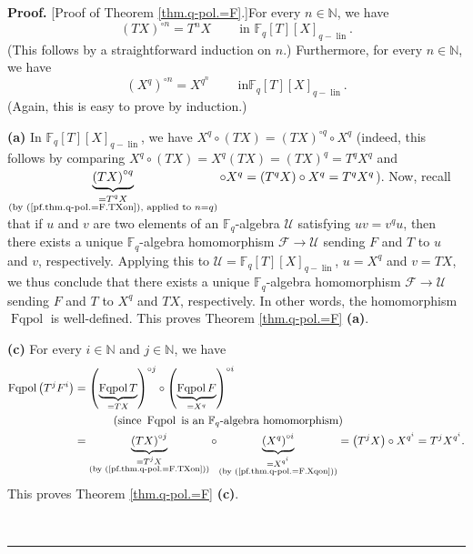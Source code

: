 \documentclass[numbers=enddot,12pt,final,onecolumn,notitlepage]{scrartcl}%
\theoremstyle{definition}
\newenvironment{proof}[1][Proof]{\noindent\textbf{#1.} }{\ \rule{0.5em}{0.5em}}
\begin{document}
\begin{proof}
[Proof of Theorem \ref{thm.q-pol.=F}.]For every $n\in\mathbb{N}$, we have%
\begin{equation}
\left(  TX\right)  ^{\circ n}=T^{n}X\ \ \ \ \ \ \ \ \ \ \text{in }%
\mathbb{F}_{q}\left[  T\right]  \left[  X\right]  _{q-\operatorname*{lin}}.
\label{pf.thm.q-pol.=F.TXon}%
\end{equation}
(This follows by a straightforward induction on $n$.) Furthermore, for every
$n\in\mathbb{N}$, we have%
\begin{equation}
\left(  X^{q}\right)  ^{\circ n}=X^{q^{n}}\ \ \ \ \ \ \ \ \ \ \text{in
}\mathbb{F}_{q}\left[  T\right]  \left[  X\right]  _{q-\operatorname*{lin}}.
\label{pf.thm.q-pol.=F.Xqon}%
\end{equation}
(Again, this is easy to prove by induction.) \medskip

\textbf{(a)} In $\mathbb{F}_{q}\left[  T\right]  \left[  X\right]
_{q-\operatorname*{lin}}$, we have $X^{q}\circ\left(  TX\right)  =\left(
TX\right)  ^{\circ q}\circ X^{q}$ (indeed, this follows by comparing
$X^{q}\circ\left(  TX\right)  =X^{q}\left(  TX\right)  =\left(  TX\right)
^{q}=T^{q}X^{q}$ and $\underbrace{\left(  TX\right)  ^{\circ q}}%
_{\substack{=T^{q}X\\\text{(by (\ref{pf.thm.q-pol.=F.TXon}), applied to
}n=q\text{)}}}\circ X^{q}=\left(  T^{q}X\right)  \circ X^{q}=T^{q}X^{q}$).
Now, recall that if $u$ and $v$ are two elements of an $\mathbb{F}_{q}%
$-algebra $\mathcal{U}$ satisfying $uv=v^{q}u$, then there exists a unique
$\mathbb{F}_{q}$-algebra homomorphism $\mathcal{F}\rightarrow\mathcal{U}$
sending $F$ and $T$ to $u$ and $v$, respectively. Applying this to
$\mathcal{U}=\mathbb{F}_{q}\left[  T\right]  \left[  X\right]
_{q-\operatorname*{lin}}$, $u=X^{q}$ and $v=TX$, we thus conclude that there
exists a unique $\mathbb{F}_{q}$-algebra homomorphism $\mathcal{F}%
\rightarrow\mathcal{U}$ sending $F$ and $T$ to $X^{q}$ and $TX$, respectively.
In other words, the homomorphism $\operatorname*{Fqpol}$ is well-defined. This
proves Theorem \ref{thm.q-pol.=F} \textbf{(a)}. \medskip

\textbf{(c)} For every $i\in\mathbb{N}$ and $j\in\mathbb{N}$, we have%
\begin{align*}
\operatorname*{Fqpol}\left(  T^{j}F^{i}\right)   &  =\left(
\underbrace{\operatorname*{Fqpol}T}_{=TX}\right)  ^{\circ j}\circ\left(
\underbrace{\operatorname*{Fqpol}F}_{=X^{q}}\right)  ^{\circ i}\\
&  \ \ \ \ \ \ \ \ \ \ \left(  \text{since }\operatorname*{Fqpol}\text{ is an
}\mathbb{F}_{q}\text{-algebra homomorphism}\right) \\
&  =\underbrace{\left(  TX\right)  ^{\circ j}}_{\substack{=T^{j}X\\\text{(by
(\ref{pf.thm.q-pol.=F.TXon}))}}}\circ\underbrace{\left(  X^{q}\right)  ^{\circ
i}}_{\substack{=X^{q^{i}}\\\text{(by (\ref{pf.thm.q-pol.=F.Xqon}))}}}=\left(
T^{j}X\right)  \circ X^{q^{i}}=T^{j}X^{q^{i}}.
\end{align*}
This proves Theorem \ref{thm.q-pol.=F} \textbf{(c)}. \medskip


\end{proof}
\end{document}
